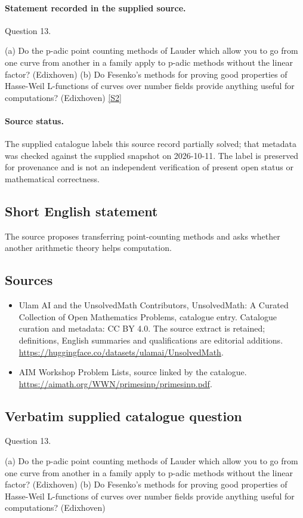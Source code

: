 \documentclass[11pt]{article}
\begin{document}
\paragraph{Statement recorded in the supplied source.}
Question 13.

(a) Do the p-adic point counting methods of Lauder which allow you to go from one curve from another in a family apply to p-adic methods without the linear factor? (Edixhoven) (b) Do Fesenko's methods for proving good properties of Hasse-Weil L-functions of curves over number fields provide anything useful for computations? (Edixhoven) \href{https://aimath.org/WWN/primesinp/primesinp.pdf}{[S2]}
\paragraph{Source status.}
The supplied catalogue labels this source record partially solved; that metadata was checked against the supplied snapshot on 2026-10-11. The label is preserved for provenance and is not an independent verification of present open status or mathematical correctness.
\subsection{Short English statement}
The source proposes transferring point-counting methods and asks whether another arithmetic theory helps computation.
\subsection{Sources}
\begin{itemize}
\item[S1] Ulam AI and the UnsolvedMath Contributors, UnsolvedMath: A Curated Collection of Open Mathematics Problems, catalogue entry. Catalogue curation and metadata: CC BY 4.0. The source extract is retained; definitions, English summaries and qualifications are editorial additions.
\url{https://huggingface.co/datasets/ulamai/UnsolvedMath}.
\item[S2] AIM Workshop Problem Lists, source linked by the catalogue.
\url{https://aimath.org/WWN/primesinp/primesinp.pdf}.
\end{itemize}
\subsection{Verbatim supplied catalogue question}
Question 13.

(a) Do the p-adic point counting methods of Lauder which allow you to go from one curve from another in a family apply to p-adic methods without the linear factor? (Edixhoven) (b) Do Fesenko's methods for proving good properties of Hasse-Weil L-functions of curves over number fields provide anything useful for computations? (Edixhoven)
\end{document}
